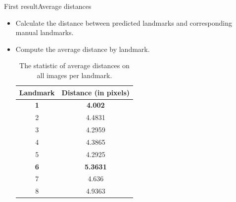 \documentclass[10pt,svgnames]{beamer}
\begin{document}

\begin{frame}{First result}{Average distances}
	\begin{itemize}			
		\item Calculate the distance between predicted landmarks and corresponding manual landmarks.	
		\item Compute the average distance by landmark.\\
		
			\begin{table}[htbp]
				\centering
				\begin{tabular}{|c|c|}
					\hline
					\textbf{Landmark} & \textbf{Distance} (in pixels) \\ \hline
					\textbf{\color{green}1} & \textbf{\color{green}4.002}  \\ \hline
					2 & 4.4831 \\ \hline
					3 & 4.2959 \\ \hline
					4 & 4.3865 \\ \hline
					5 & 4.2925 \\ \hline
					\textbf{\color{red}6} & \textbf{\color{red}5.3631} \\ \hline
					7 & 4.636 \\ \hline
					8 & 4.9363 \\ \hline
				\end{tabular}
				\caption*{The statistic of average distances on all images per landmark.}
			\end{table}
	\end{itemize}
\end{frame}

\end{document}
